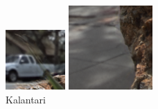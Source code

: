 \documentclass[10pt,twocolumn,letterpaper]{article}
\begin{document}
\begin{figure}[h]
\begin{multicols}{2}
\begin{multicols}{3}
            \includegraphics[width=\linewidth]{rock_crop_leaf/kalantari_05_05.png}\par\vspace{0.1in}\includegraphics[width=\linewidth]{rock_crop_walk/kalantari_05_05.png}\par\caption*{Kalantari \etal}

\end{multicols}
\end{multicols}
\end{figure}
\end{document}
